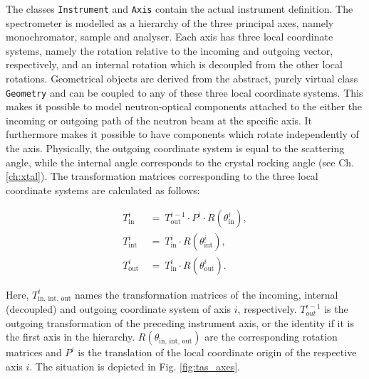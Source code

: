 The classes \lstinline[language=C++]|Instrument| and \lstinline[language=C++]|Axis| contain the actual instrument definition.
The spectrometer is modelled as a hierarchy of the three principal axes, namely monochromator, sample and analyser.
Each axis has three local coordinate systems, namely the rotation relative to the incoming and outgoing vector, respectively,
and an internal rotation which is decoupled from the other local rotations.
Geometrical objects are derived from the abstract, purely virtual class \lstinline[language=C++]|Geometry| and can be
coupled to any of these three local coordinate systems.
This makes it possible to model neutron-optical components attached to the either the incoming or outgoing path of the
neutron beam at the specific axis. It furthermore makes it possible to have components which rotate independently of
the axis.
Physically, the outgoing coordinate system is equal to the scattering angle, while the internal angle corresponds
to the crystal rocking angle (see Ch. \ref{ch:xtal}).
The transformation matrices corresponding to the three local coordinate systems are calculated as follows:

\begin{equation}
\begin{split}
	T_{\mathrm{in}}^{i} & \ =\  T_{\mathrm{out}}^{i-1} \cdot P^{i} \cdot R\left(\theta_{\mathrm{in}}^{i}\right), \\
	T_{\mathrm{int}}^{i} & \ =\  T_{\mathrm{in}}^{i} \cdot R\left(\theta_{\mathrm{int}}^{i}\right), \\
	T_{\mathrm{out}}^{i} & \ =\  T_{\mathrm{in}}^{i} \cdot R\left(\theta_{\mathrm{out}}^{i}\right).
\end{split}
\end{equation}

Here, $T_{\mathrm{in,\, int,\, out}}^{i}$ names the transformation matrices of the incoming, internal (decoupled) and outgoing
coordinate system of axis $i$, respectively.
$T_{out}^{i-1}$ is the outgoing transformation of the preceding instrument axis, or the identity if it is the first axis in the hierarchy.
$R\left(\theta_{\mathrm{in,\, int,\, out}}\right)$ are the corresponding rotation matrices and $P^i$ is the translation
of the local coordinate origin of the respective axis $i$.
The situation is depicted in Fig. \ref{fig:tas_axes}.


